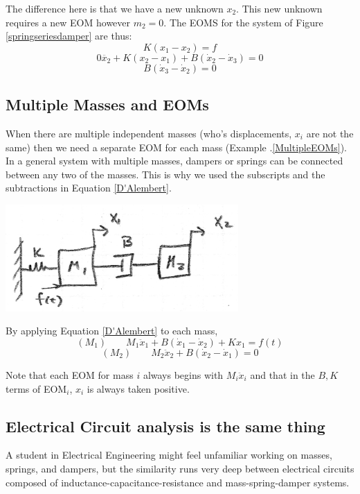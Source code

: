 The difference here is that we have a new unknown $x_2$.    This new unknown requires a new EOM however $m_2 =0$.   The EOMS for the system of Figure \ref{springseriesdamper} are thus:
\[
K(x_1-x_2) = f
\]
\[
0\ddot{x_2} + K(x_2-x_1) + B(\dot{x}_2-\dot{x}_3) = 0
\]
\[
B(\dot{x}_3-\dot{x}_2) = 0
\]






\subsection{Multiple Masses and EOMs}
When there are multiple independent masses (who's displacements, $x_i$ are not the same) then we need a separate EOM for each mass (Example \thechapter.\ref{MultipleEOMs}).
In a general system with multiple masses, dampers or springs can be connected between any two of the masses.  This is why we used the subscripts and the subtractions in Equation \ref{D'Alembert}.



\begin{ExampleSmall}\label{MultipleEOMs}


\includegraphics[width=3.5in]{figs02/00726a.png}



By applying Equation \ref{D'Alembert} to each mass,
\[
(M_1) \qquad M_1\ddot{x}_1 + B(\dot{x}_1 - \dot{x}_2) + Kx_1 = f(t)
\]
\[
(M_2) \qquad M_2\ddot{x}_2 + B(\dot{x}_2-\dot{x}_1)  = 0
\]

Note that each EOM for mass $i$ always begins with $M_i\ddot{x}_i$ and that in the $B,K$ terms of EOM$_i$, $x_i$ is always taken positive.
\end{ExampleSmall}




\subsection{Electrical Circuit analysis is the same thing}
A student in Electrical Engineering might feel unfamiliar working
on masses, springs, and dampers, but the similarity runs very deep
between electrical circuits composed of inductance-capacitance-resistance and mass-spring-damper systems.

